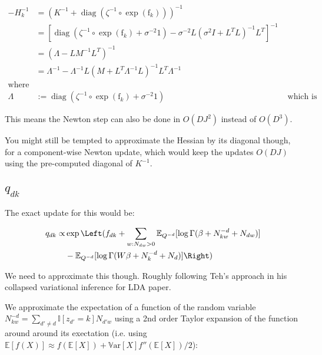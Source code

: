 \documentclass{report}
\DeclareMathOperator{\diag}{diag}
\renewcommand{\v}[1]{\boldsymbol{\mathrm{#1}}}
\newcommand{\E}{\mathbb{E}}
\newcommand{\Var}{\mathbb{V}\mathrm{ar}}
\newcommand{\I}{\mathbb{I}}
\begin{document}
\begin{align*}
  -H_k^{-1} &= (K^{-1} + \diag(\zeta^{-1} \circ \exp(\v{f}_{k})))^{-1} \\
  &= \left[\diag(\zeta^{-1} \circ \exp(\v{f}_{k}) + \sigma^{-2}\v{1}) -
  \sigma^{-2}L(\sigma^2 I + L^TL)^{-1}L^T\right]^{-1} \\
  &= (\Lambda - LM^{-1}L^T)^{-1} \\
  &= \Lambda^{-1} - \Lambda^{-1}L(M +
  L^T\Lambda^{-1}L)^{-1}L^T\Lambda^{-1} \\
  \text{where} \\
  \Lambda &:= \diag(\zeta^{-1} \circ \exp(\v{f}_{k}) + \sigma^{-2}\v{1}) &
  \text{ which is diagonal}
\end{align*}

This means the Newton step can also be done in $O(DJ^2)$ instead of
$O(D^3)$.

You might still be tempted to approximate the Hessian by its diagonal
though, for a component-wise Newton update, which would keep the
updates $O(DJ)$ using the pre-computed diagonal of $K^{-1}$.

\subsection{$q_{dk}$}

The exact update for this would be:

\begin{align*}
q_{dk}  \propto & \exp\Left(f_{dk} + \sum_{w : N_{dw}>0} \E_{Q^{-d}}[\log\Gamma(\beta +
  N^{-d}_{kw} + N_{dw})] \\
&- \E_{Q^{-d}}[\log\Gamma(W\beta +  N^{-d}_{k} + N_{d})]\Right)
\end{align*}

We need to approximate this though. Roughly following Teh's approach
in his collapsed variational inference for LDA paper.

We approximate the expectation of a function of the random variable
$N^{-d}_{kw} = \sum_{d' \neq d} \I[z_{d'}=k] N_{d'w}$ using a 2nd
order Taylor expansion of the function around around its exectation
(i.e. using $\E[ f(X) ] \approx f(\E[X]) + \Var[X] f''(\E[X])/2$):
\end{document}
